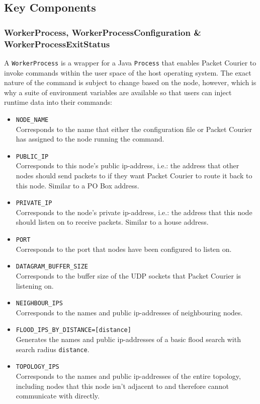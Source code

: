 \subsection{Key Components}

\subsubsection{WorkerProcess, WorkerProcessConfiguration \& WorkerProcessExitStatus}

A \texttt{WorkerProcess} is a wrapper for a Java \texttt{Process}\cite{java_Process} that enables Packet Courier to
invoke commands within the user space of the host operating system. The exact nature of the command is subject to
change based on the node, however, which is why a suite of environment variables are available so that users can
inject runtime data into their commands:
\begin{itemize}
    \item \texttt{NODE\_NAME} \\
    Corresponds to the name that either the configuration file or Packet Courier has assigned to the node running the
    command.
    \item \texttt{PUBLIC\_IP} \\
    Corresponds to this node's public ip-address, i.e.: the address that other nodes should send packets to if they
    want Packet Courier to route it back to this node. Similar to a PO Box address.
    \item \texttt{PRIVATE\_IP} \\
    Corresponds to the node's private ip-address, i.e.: the address that this node should listen on to receive
    packets. Similar to a house address.
    \item \texttt{PORT} \\
    Corresponds to the port that nodes have been configured to listen on.
    \item \texttt{DATAGRAM\_BUFFER\_SIZE} \\
    Corresponds to the buffer size of the UDP sockets that Packet Courier is listening on.
    \item \texttt{NEIGHBOUR\_IPS} \\
    Corresponds to the names and public ip-addresses of neighbouring nodes.
    \item \texttt{FLOOD\_IPS\_BY\_DISTANCE=[distance]} \\
    Generates the names and public ip-addresses of a basic flood search with search radius \texttt{distance}.
    \item \texttt{TOPOLOGY\_IPS} \\
    Corresponds to the names and public ip-addresses of the entire topology, including nodes that this node isn't
    adjacent to and therefore cannot communicate with directly.
\end{itemize}

